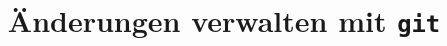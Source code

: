 

\title[\texttt{git}]{Änderungen verwalten mit \texttt{git}}



{
  \begin{frame}
    \titlepage
  \end{frame}
}





